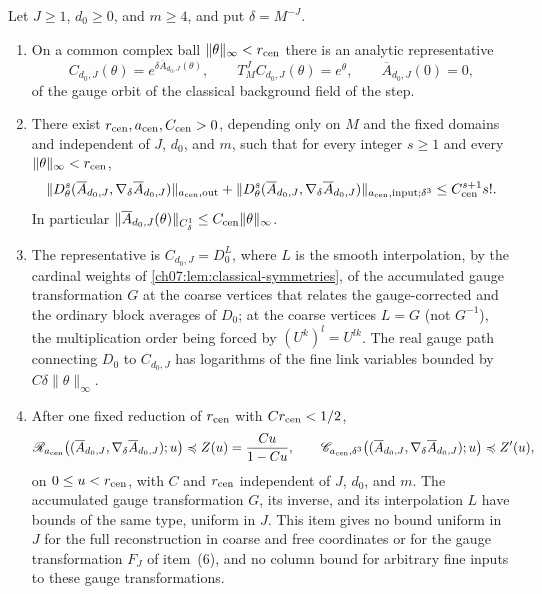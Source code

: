 \begin{lemma}\label{ch08:lem:aligned-zero-white}
Let $J\ge1$, $d_0\ge0$, and $m\ge4$, and put $\delta=M^{-J}$.
\begin{enumerate}
\item On a common complex ball $\|\theta\|_\infty<r_{\rm cen}$ there is an analytic representative
\[
 C_{d_0,J}(\theta)=e^{\delta\overline A_{d_0,J}(\theta)},\qquad
 T_M^JC_{d_0,J}(\theta)=e^\theta,
 \qquad \overline A_{d_0,J}(0)=0,
\]
of the gauge orbit of the classical background field of the step.
\item There exist $r_{\rm cen},a_{\rm cen},C_{\rm cen}>0$, depending only on $M$ and the fixed domains and independent of $J$, $d_0$, and $m$, such that for every integer $s\ge1$ and every $\|\theta\|_\infty<r_{\rm cen}$,
\[
 \|D_\theta^s(\overline A_{d_0,J},\nabla_\delta\overline A_{d_0,J})
                                      \|_{a_{\rm cen},\mathrm{out}}
 +\|D_\theta^s(\overline A_{d_0,J},\nabla_\delta\overline A_{d_0,J})
                         \|_{a_{\rm cen},\mathrm{input};\delta^3}
 \le C_{\rm cen}^{s+1}s!.
\]
In particular $\|\overline A_{d_0,J}(\theta)\|_{C^1_\delta}\le C_{\rm cen}\|\theta\|_\infty$.
\item The representative is $C_{d_0,J}=D_0^{L}$, where $L$ is the smooth interpolation, by the cardinal weights of \cref{ch07:lem:classical-symmetries}, of the accumulated gauge transformation $G$ at the coarse vertices that relates the gauge-corrected and the ordinary block averages of $D_0$; at the coarse vertices $L=G$ (not $G^{-1}$), the multiplication order being forced by $(U^k)^l=U^{lk}$. The real gauge path connecting $D_0$ to $C_{d_0,J}$ has logarithms of the fine link variables bounded by $C\delta\|\theta\|_\infty$.
\item After one fixed reduction of $r_{\rm cen}$ with $Cr_{\rm cen}<1/2$,
\[
 \mathscr R_{a_{\rm cen}}\bigl((\overline A_{d_0,J},\nabla_\delta\overline A_{d_0,J});u\bigr)\preccurlyeq Z(u)=\frac{Cu}{1-Cu},\qquad
 \mathscr C_{a_{\rm cen},\delta^3}\bigl((\overline A_{d_0,J},\nabla_\delta\overline A_{d_0,J});u\bigr)\preccurlyeq Z'(u),
\]
on $0\le u<r_{\rm cen}$, with $C$ and $r_{\rm cen}$ independent of $J$, $d_0$, and $m$. The accumulated gauge transformation $G$, its inverse, and its interpolation $L$ have bounds of the same type, uniform in $J$. This item gives no bound uniform in $J$ for the full reconstruction in coarse and free coordinates or for the gauge transformation $F_J$ of item~(6), and no column bound for arbitrary fine inputs to these gauge transformations.

\end{enumerate}
\end{lemma}
